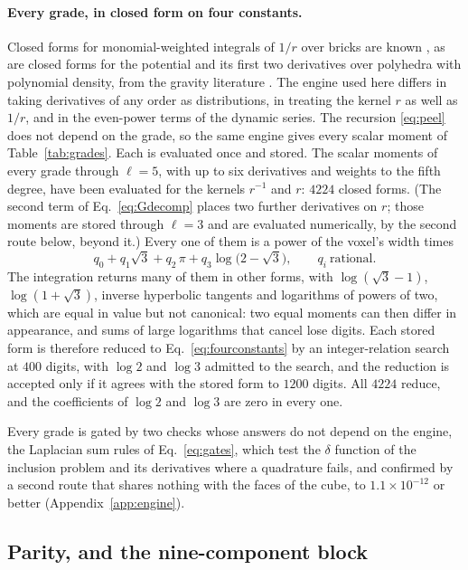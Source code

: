 \documentclass[11pt,a4paper]{article}
\begin{document}
\paragraph{Every grade, in closed form on four constants.} Closed forms for monomial-weighted
integrals of $1/r$ over bricks are known \citep{Hackbusch2002}, as are closed forms for the potential
and its first two derivatives over polyhedra with polynomial density, from the gravity literature
\citep{Ren2020}. The engine used here differs in taking derivatives of any order as distributions, in
treating the kernel $r$ as well as $1/r$, and in the even-power terms of the dynamic series. The
recursion \eqref{eq:peel} does not
depend on the grade, so the same engine gives every scalar moment of Table~\ref{tab:grades}. Each is
evaluated once and stored. The scalar moments of every grade through $\ell=5$, with up to six
derivatives and weights to the fifth degree, have been evaluated for the kernels $r^{-1}$ and $r$:
$4224$ closed forms. (The second term of Eq.~\eqref{eq:Gdecomp} places two further derivatives on
$r$; those moments are stored through $\ell=3$ and are evaluated numerically, by the second route
below, beyond it.) Every one of them is a power of the voxel's width times
\begin{equation}\label{eq:fourconstants}
  q_0+q_1\sqrt3+q_2\,\pi+q_3\log\bigl(2-\sqrt3\bigr),\qquad q_i\ \text{rational}.
\end{equation}
The integration returns many of them in other forms, with $\log(\sqrt3-1)$, $\log(1+\sqrt3)$, inverse
hyperbolic tangents and logarithms of powers of two, which are equal in value but not canonical: two
equal moments can then differ in appearance, and sums of large logarithms that cancel lose digits. Each
stored form is therefore reduced to Eq.~\eqref{eq:fourconstants} by an integer-relation search at $400$
digits, with $\log2$ and $\log3$ admitted to the search, and the reduction is accepted only if it agrees
with the stored form to $1200$ digits. All $4224$ reduce, and the coefficients of $\log2$ and $\log3$
are zero in every one.

Every grade is gated by two checks whose answers do not depend on the engine, the Laplacian
sum rules of Eq.~\eqref{eq:gates}, which test the $\delta$ function of the inclusion problem and its
derivatives where a quadrature fails, and confirmed by a second route that shares nothing with the
faces of the cube, to $1.1\times10^{-12}$ or better (Appendix~\ref{app:engine}).

\subsection{Parity, and the nine-component block}\label{sec:parity}
\end{document}
